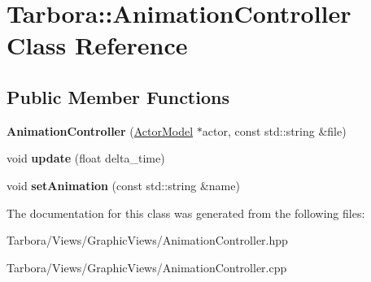 \hypertarget{classTarbora_1_1AnimationController}{}\section{Tarbora\+:\+:Animation\+Controller Class Reference}
\label{classTarbora_1_1AnimationController}
\subsection*{Public Member Functions}
\begin{DoxyCompactItemize}
\item 
\mbox{\label{classTarbora_1_1AnimationController_a7452dfd1eaf8d8b89155a53eca664102}} 
{\bfseries Animation\+Controller} (\hyperlink{classTarbora_1_1ActorModel}{Actor\+Model} $\ast$actor, const std\+::string \&file)
\item 
\mbox{\label{classTarbora_1_1AnimationController_a82a408fc56cacb9acb994ac9636a9de9}} 
void {\bfseries update} (float delta\+\_\+time)
\item 
\mbox{\label{classTarbora_1_1AnimationController_a61441d8e1e258a73f0c05074aaada09f}} 
void {\bfseries set\+Animation} (const std\+::string \&name)
\end{DoxyCompactItemize}


The documentation for this class was generated from the following files\+:\begin{DoxyCompactItemize}
\item 
Tarbora/\+Views/\+Graphic\+Views/Animation\+Controller.\+hpp\item 
Tarbora/\+Views/\+Graphic\+Views/Animation\+Controller.\+cpp\end{DoxyCompactItemize}
